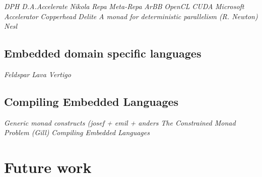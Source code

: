 \documentclass[a4paper]{book}
\begin{document}
\noindent\emph{DPH}\citet{DPH} \newline
\noindent\emph{D.A.Accelerate}\citet{ACCELERATEDAMP11} \newline
\noindent\emph{Nikola}\citet{NIKOLA}\newline
\noindent\emph{Repa}\citet{REPA}\newline
\noindent\emph{Meta-Repa}\citet{METAREPA}\newline
\noindent\emph{ArBB}\citet{ARBB2011}\newline
\noindent\emph{OpenCL}\citet{OpenCL}\newline
\noindent\emph{CUDA}\citet{CUDA}\newline
\noindent\emph{Microsoft Accelerator}\citet{ACCELERATOR}\newline
\noindent\emph{Copperhead}\citet{copperhead}\newline
\noindent\emph{Delite}\citet{DELITE}\newline
\noindent\emph{A monad for deterministic parallelism (R. Newton)} \citet{MonadPar} \newline
\noindent\emph{Nesl}\citet{NESL} \newline

\subsection{Embedded domain specific languages} 

\noindent\emph{Feldspar}\citet{FELDSPAR2010} \newline
\noindent\emph{Lava}\citet{lavaICFP} \newline
\noindent\emph{Vertigo}\citet{VERTIGO}  \newline


\subsection{Compiling Embedded Languages}

\noindent\emph{Generic monad constructs (josef + emil + anders}\citet{Generic} \newline
\noindent\emph{The Constrained Monad Problem (Gill)}\citet{sculthorpe2013constrained} \newline
\noindent\emph{Compiling Embedded Languages}\citet{COMPILEEDSL} \newline


\section{Future work} 
\end{document}
